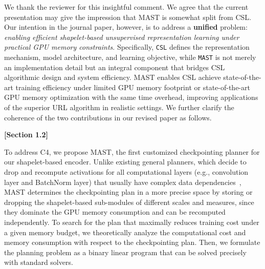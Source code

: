 \begin{sloppypar}

We thank the reviewer for this insightful comment. We agree that the current presentation may give the impression that MAST is somewhat split from CSL. Our intention in the journal paper, however, is to address a \textbf{unified} problem: \textit{enabling efficient shapelet-based unsupervised representation learning under practical GPU memory constraints}. Specifically, \texttt{CSL} defines the representation mechanism, model architecture, and learning objective, while \texttt{MAST} is not merely an implementation detail but an integral component that bridges CSL algorithmic design and system efficiency. MAST enables CSL achieve state-of-the-art training efficiency under limited GPU memory footprint or state-of-the-art GPU memory optimization with the same time overhead, improving applications of the superior URL algorithm in realistic settings. We further clarify the coherence of the two contributions in our revised paper as follows.

\begin{framed}
    \textbf{[Section 1.2]}
    
To address C4, we propose \textsf{MAST}, the first customized checkpointing planner for our shapelet-based encoder. Unlike existing general planners, which decide to drop and recompute activations for all computational layers (e.g., convolution layer and BatchNorm layer) that usually have complex data dependencies~\cite{jain2020checkmate}, MAST determines the checkpointing plan in a more precise space by storing or dropping the shapelet-based sub-modules of different scales and measures, since they dominate the GPU memory consumption and can be recomputed independently. To search for the  plan that maximally reduces training cost under a given memory budget, we theoretically analyze the computational cost and memory consumption with respect to the checkpointing plan. Then, we formulate the planning problem as a binary linear program that can be solved precisely with standard solvers.     
\end{framed}



\end{sloppypar}
